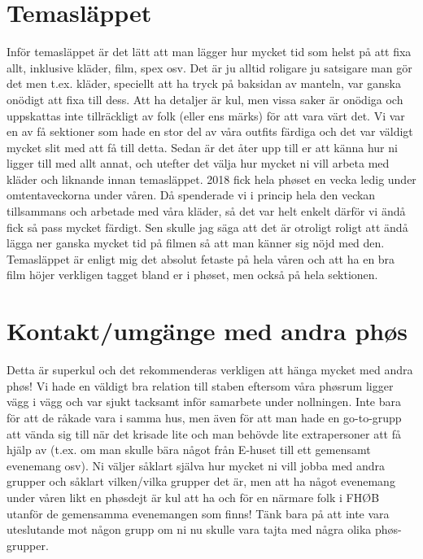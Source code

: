 \documentclass[10pt]{article}
\begin{document}
    \section{Temasläppet}
    Inför temasläppet är det lätt att man lägger hur mycket tid som helst på att fixa allt, inklusive kläder, film, spex osv. Det är ju alltid roligare ju satsigare man gör det men t.ex. kläder, speciellt att ha tryck på baksidan av manteln, var ganska onödigt att fixa till dess. Att ha detaljer är kul, men vissa saker är onödiga och uppskattas inte tillräckligt av folk (eller ens märks) för att vara värt det. Vi var en av få sektioner som hade en stor del av våra outfits färdiga och det var väldigt mycket slit med att få till detta. Sedan är det åter upp till er att känna hur ni ligger till med allt annat, och utefter det välja hur mycket ni vill arbeta med kläder och liknande innan temasläppet. 2018 fick hela phøset en vecka ledig under omtentaveckorna under våren. Då spenderade vi i princip hela den veckan tillsammans och arbetade med våra kläder, så det var helt enkelt därför vi ändå fick så pass mycket färdigt. Sen skulle jag säga att det är otroligt roligt att ändå lägga ner ganska mycket tid på filmen så att man känner sig nöjd med den. Temasläppet är enligt mig det absolut fetaste på hela våren och att ha en bra film höjer verkligen tagget bland er i phøset, men också på hela sektionen.

    \section{Kontakt/umgänge med andra phøs}
    Detta är superkul och det rekommenderas verkligen att hänga mycket med andra phøs! Vi hade en väldigt bra relation till staben eftersom våra phøsrum ligger vägg i vägg och var sjukt tacksamt inför samarbete under nollningen. Inte bara för att de råkade vara i samma hus, men även för att man hade en go-to-grupp att vända sig till när det krisade lite och man behövde lite extrapersoner att få hjälp av (t.ex. om man skulle bära något från E-huset till ett gemensamt evenemang osv). Ni väljer såklart själva hur mycket ni vill jobba med andra grupper och såklart vilken/vilka grupper det är, men att ha något evenemang under våren likt en phøsdejt är kul att ha och för en närmare folk i FHØB utanför de gemensamma evenemangen som finns! Tänk bara på att inte vara uteslutande mot någon grupp om ni nu skulle vara tajta med några olika phøs-grupper.
\end{document}

